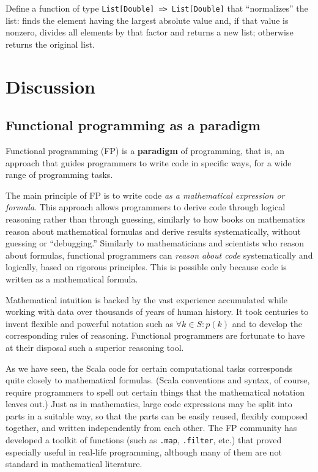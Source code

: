 Define a function of type \texttt{}\lstinline!List[Double] => List[Double]!
that ``normalizes'' the list: finds the element having the largest
absolute value and, if that value is nonzero, divides all elements
by that factor and returns a new list; otherwise returns the original
list.

\section{Discussion}

\subsection{Functional programming as a paradigm}

Functional programming (FP) is a \textbf{paradigm}
of programming, \textendash{} that is, an approach that guides programmers
to write code in specific ways, for a wide range of programming tasks.

The main principle of FP is to write code \emph{as a mathematical
expression or formula}. This approach allows programmers to derive
code through logical reasoning rather than through guessing, \textendash{}
similarly to how books on mathematics reason about mathematical formulas
and derive results systematically, without guessing or ``debugging.''
Similarly to mathematicians and scientists who reason about formulas,
functional programmers can \emph{reason about code} systematically
and logically, based on rigorous principles. This is possible only
because code is written as a mathematical formula.

Mathematical intuition is backed by the vast experience accumulated
while working with data over thousands of years of human history.
It took centuries to invent flexible and powerful notation such as
$\forall k\in S:p(k)$ and to develop the corresponding rules of reasoning.
Functional programmers are fortunate to have at their disposal such
a superior reasoning tool.

As we have seen, the Scala code for certain computational tasks corresponds
quite closely to mathematical formulas. (Scala conventions and syntax,
of course, require programmers to spell out certain things that the
mathematical notation leaves out.) Just as in mathematics, large code
expressions may be split into parts in a suitable way, so that the
parts can be easily reused, flexibly composed together, and written
independently from each other. The FP community has developed a toolkit
of functions (such as \lstinline!.map!, \texttt{}\lstinline!.filter!,
etc.) that proved especially useful in real-life programming, although
many of them are not standard in mathematical literature.

